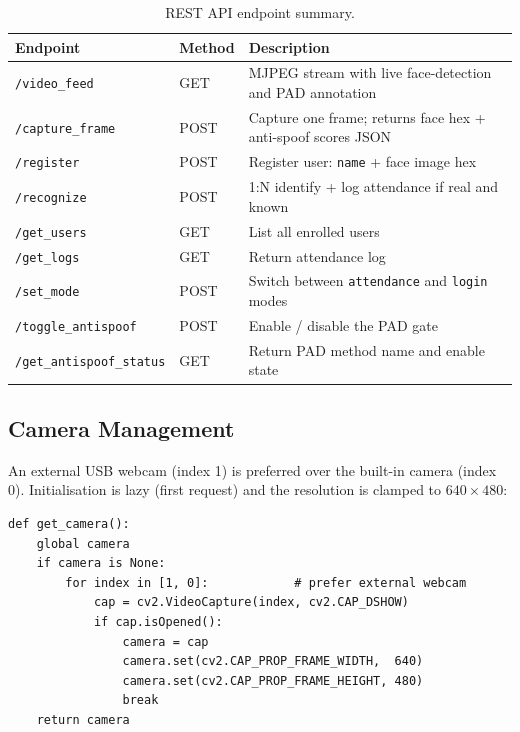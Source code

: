 \documentclass[11pt,a4paper]{article}
\begin{document}
\begin{table}[H]
\centering
\caption{REST API endpoint summary.}
\label{tab:api}
\renewcommand{\arraystretch}{1.2}
\begin{tabular}{@{}llp{7cm}@{}}
\toprule
\textbf{Endpoint} & \textbf{Method} & \textbf{Description} \\
\midrule
\texttt{/video\_feed}            & GET  & MJPEG stream with live face-detection and PAD annotation \\
\texttt{/capture\_frame}         & POST & Capture one frame; returns face hex + anti-spoof scores JSON \\
\texttt{/register}               & POST & Register user: \texttt{name} + face image hex \\
\texttt{/recognize}              & POST & 1:N identify + log attendance if real and known \\
\texttt{/get\_users}             & GET  & List all enrolled users \\
\texttt{/get\_logs}              & GET  & Return attendance log \\
\texttt{/set\_mode}              & POST & Switch between \texttt{attendance} and \texttt{login} modes \\
\texttt{/toggle\_antispoof}      & POST & Enable / disable the PAD gate \\
\texttt{/get\_antispoof\_status} & GET  & Return PAD method name and enable state \\
\bottomrule
\end{tabular}
\end{table}

\subsection{Camera Management}

An external USB webcam (index 1) is preferred over the built-in camera (index 0).
Initialisation is lazy (first request) and the resolution is clamped to
$640\times 480$:

\begin{lstlisting}[caption={Camera preference logic (\texttt{app.py}, lines 25--36).}]
def get_camera():
    global camera
    if camera is None:
        for index in [1, 0]:            # prefer external webcam
            cap = cv2.VideoCapture(index, cv2.CAP_DSHOW)
            if cap.isOpened():
                camera = cap
                camera.set(cv2.CAP_PROP_FRAME_WIDTH,  640)
                camera.set(cv2.CAP_PROP_FRAME_HEIGHT, 480)
                break
    return camera
\end{lstlisting}
\end{document}
